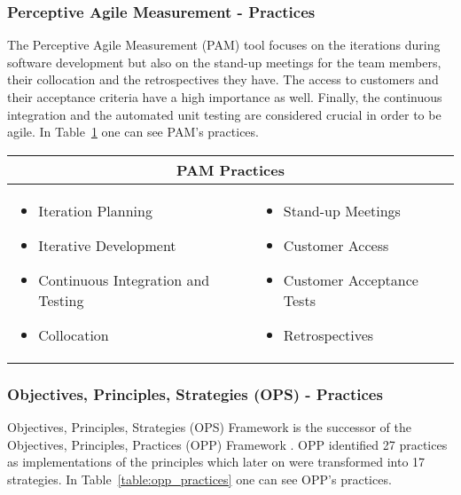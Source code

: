 \subsubsection[\ac{PAM} Practices]{Perceptive Agile Measurement - Practices}
The Perceptive Agile Measurement (\ac{PAM}) tool focuses on the iterations during software development but also on the stand-up meetings for the team members, their collocation and the retrospectives they have. The access to customers and their acceptance criteria have a high importance as well. Finally, the continuous integration and the automated unit testing are considered crucial in order to be agile. In Table~\ref{table:pam_practices} one can see \ac{PAM}'s practices.

\begin{table} [H]
  \begin{tabular}{| p{6cm} p{6cm} |}
    \hline
    \multicolumn{2}{|c|}{\textbf{\ac{PAM} Practices}}  \\ \hline
    	\begin{itemize} \item Iteration Planning \item Iterative Development \item Continuous Integration and Testing \item Collocation \end{itemize} &
     \begin{itemize} \item Stand-up Meetings \item Customer Access \item Customer Acceptance Tests \item Retrospectives \end{itemize}  \\ \hline
  \end{tabular}
  \label{table:pam_practices}
\end{table}

\subsubsection[\ac{OPS} Practices]{Objectives, Principles, Strategies (OPS) - Practices}
Objectives, Principles, Strategies (\ac{OPS}) Framework is the successor of the Objectives, Principles, Practices (\ac{OPP}) Framework \cite{opp}. \ac{OPP} identified 27 practices as implementations of the principles which later on were transformed into 17 strategies. In Table~\ref{table:opp_practices} one can see \ac{OPP}'s practices. 

